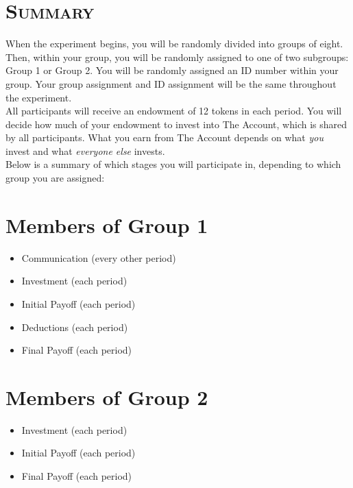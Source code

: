 \documentclass[12pt]{article}
\begin{document}
\section*{\scshape Summary}

\iffalse
When the experiment begins, you will be randomly divided into groups of eight.  Then, within your group, you will be randomly assigned to one of two subgroups: Group 1 or Group 2.  You will be randomly assigned an ID number within your group.  Your group assignment and ID assignment will be the same throughout the experiment.\\

All participants will receive an endowment of 12 tokens in each period.  You will decide how much of your endowment to invest into The Account, which is shared by all participants. What you earn from The Account depends on what {\em you} invest and what {\em everyone else} invests.\\  

Below is a summary of which stages you will participate in, depending to which group you are assigned:

\section*{Members of Group 1}

\begin{itemize}
\item Communication (every other period)
\item Investment (each period)
\item Initial Payoff (each period)
\item Deductions (each period)
\item Final Payoff (each period)
\end{itemize}

\section*{Members of Group 2}

\begin{itemize}
\item Investment (each period)
\item Initial Payoff (each period)
\item Final Payoff (each period)
\end{itemize}
\end{document}
